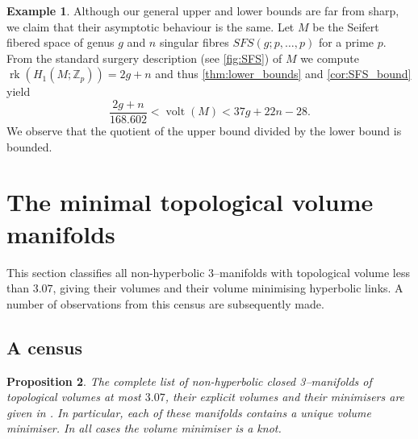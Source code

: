 \documentclass[a4paper]{gtart}
\newtheorem{proposition}{Proposition}[section]
\theoremstyle{definition}
\newtheorem{example}[proposition]{Example}
\theoremstyle{remark}
\numberwithin{equation}{section}
\newcommand{\Z}{\mathbb{Z}}
\DeclareMathOperator{\volt}{volt}
\begin{document}
\begin{example}\label{ex:SFS}
Although our general upper and lower bounds are far from sharp, we claim that their asymptotic behaviour is the same. Let $M$ be the Seifert fibered space of genus $g$ and $n$ singular fibres $SFS(g;p,\ldots, p)$ for a prime $p$. From the standard surgery description (see \cref{fig:SFS}) of $M$ we compute $\operatorname{rk}(H_1(M;\Z_p))=2g+n$ and thus \cref{thm:lower_bounds} and \cref{cor:SFS_bound} yield
    \begin{equation*}
        \frac{2g+n}{168.602} <\volt(M) < 37g+22n-28.
    \end{equation*}
    We observe that the quotient of the upper bound divided by the lower bound is bounded.
\end{example}

\section{The minimal topological volume manifolds}\label{sec:computations}

This section classifies all non-hyperbolic $3$--manifolds with topological volume less than $3.07$, giving their volumes and their volume minimising hyperbolic links. A number of observations from this census are subsequently made.

\subsection{A census}
\label{sec:census}

\begin{proposition}\label{prop:census}
The complete list of non-hyperbolic closed 3--manifolds of topological volumes at most $3.07$, their explicit volumes and their minimisers are given in . In particular, each of these manifolds contains a unique volume minimiser. In all cases the volume minimiser is a knot.
\end{proposition}
\end{document}
